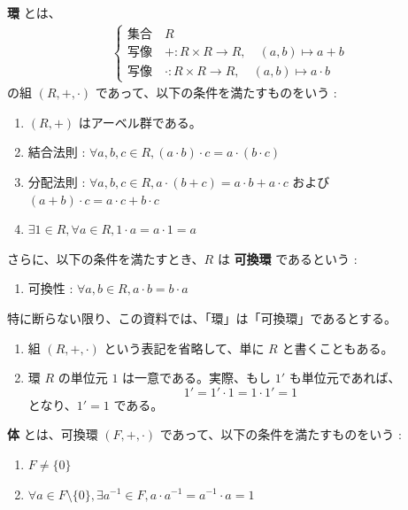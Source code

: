 \documentclass[article,paper=a4paper]{jlreq}
\begin{document}
\begin{dfn}
  \textbf{環} とは、
  \begin{align*}
    \begin{cases}
      \text{集合} \quad R \\
      \text{写像} \quad + \colon R \times R \to R, \quad (a, b) \mapsto a + b \\
      \text{写像} \quad \cdot \colon R \times R \to R, \quad (a, b) \mapsto a \cdot b
    \end{cases}
  \end{align*}
  の組 $(R, +, \cdot)$ であって、以下の条件を満たすものをいう : 
  \begin{enumerate}
    \item $(R, +)$ はアーベル群である。
    \item 結合法則 : $\forall a, b, c \in R, (a \cdot b) \cdot c = a \cdot (b \cdot c)$
    \item 分配法則 : $\forall a, b, c \in R, a \cdot (b + c) = a \cdot b + a \cdot c$ および $(a + b) \cdot c = a \cdot c + b \cdot c$
    \item $\exists 1 \in R, \forall a \in R, 1 \cdot a = a \cdot 1 = a$ 
  \end{enumerate}
  さらに、以下の条件を満たすとき、$R$ は \textbf{可換環} であるという :
\begin{enumerate}[resume]
  \item 可換性 : $\forall a, b \in R, a \cdot b = b \cdot a$
\end{enumerate}
\end{dfn}

\begin{rem}
  特に断らない限り、この資料では、「環」は「可換環」であるとする。
\end{rem}

\begin{rem}
  \begin{enumerate}
    \item 組 $(R, +, \cdot)$ という表記を省略して、単に $R$ と書くこともある。
    \item 環 $R$ の単位元 $1$ は一意である。実際、もし $1'$ も単位元であれば、
    \[1' = 1' \cdot 1 = 1 \cdot 1' = 1\]
    となり、$1' = 1$ である。
  \end{enumerate}
\end{rem}

\begin{dfn}
  \textbf{体} とは、可換環 $(F, +, \cdot)$ であって、以下の条件を満たすものをいう :
  \begin{enumerate}
    \item $F \neq \{0\}$
    \item $\forall a \in F \setminus \{0\}, \exists a^{-1} \in F, a \cdot a^{-1} = a^{-1} \cdot a = 1$
  \end{enumerate}
\end{dfn}
\end{document}
